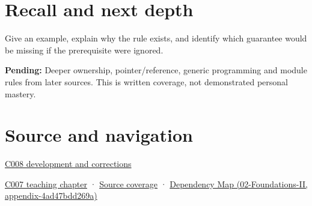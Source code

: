 \section{Recall and next depth}\label{appendix-3f7e15effba6-recall-and-next-depth}

Give an example, explain why the rule exists, and identify which guarantee would be missing if the prerequisite were ignored.

\textbf{Pending:} Deeper ownership, pointer/reference, generic programming and module rules from later sources. This is written coverage, not demonstrated personal mastery.

\section{Source and navigation}\label{appendix-3f7e15effba6-source-and-navigation}

\hyperref[appendix-fd090d982a15-m008---parts-113-126]{C008 development and corrections}

\href{Continuous\%20Notes/Computing\%20Foundations\%20-\%20From\%20Bits\%20to\%20C++\%20and\%20Systems\%20APIs\#Bringing\%20the\%20object\%20model\%20back\%20to\%20bytes}{C007 teaching chapter} · \hyperref[appendix-fd090d982a15-m007---parts-101-112]{Source coverage} · \href{../02-Foundations-II/main.pdf\#nameddest=appendix-4ad47bdd269a}{Dependency Map (02-Foundations-II, appendix-4ad47bdd269a)}
